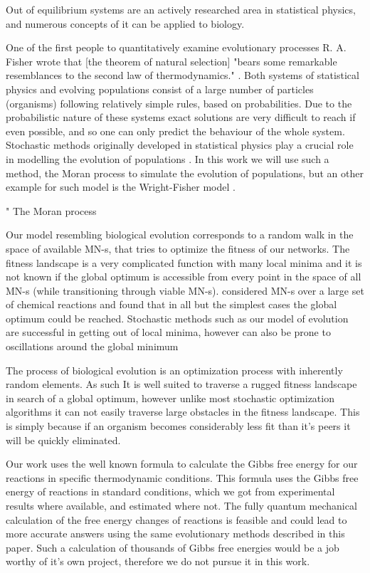 \documentclass[a4paper,12pt]{article}
\begin{document}
	Out of equilibrium systems are an actively researched area in statistical physics, and numerous concepts of it can be applied to biology. 
	
	One of the first people to quantitatively examine evolutionary processes R. A. Fisher wrote that [the theorem of natural selection] "bears some remarkable resemblances to the second law of thermodynamics." \cite{fisherevolution}. Both systems of statistical physics and evolving populations consist of a large number of particles (organisms) following relatively simple rules, based on probabilities. Due to the probabilistic nature of these systems exact solutions are very difficult to reach if even possible, and so one can only predict the behaviour of the whole system. Stochastic methods originally developed in statistical physics play a crucial role in modelling the evolution of populations \cite{stochasticblythe}. In this work we will use such a method, the Moran process \cite{moranprocess} to simulate the evolution of populations, but an other example for such model is the Wright-Fisher model \cite{mathematicalpopgen}.

"
	The Moran process 

	Our model resembling biological evolution corresponds to a random walk in the space of available MN-s, that tries to optimize the fitness of our networks. The fitness landscape is a very complicated function with many local minima and it is not known if the global optimum is accessible from every point in the space of all MN-s (while transitioning through viable MN-s). \cite{historical} considered MN-s over a large set of chemical reactions and found that in all but the simplest cases the global optimum could be reached. Stochastic methods such as our model of evolution are successful in getting out of local minima, however can also be prone to oscillations around the global minimum 

	The process of biological evolution is an optimization process with inherently random elements. As such It is well suited to traverse a rugged fitness landscape in search of a global optimum, however unlike most stochastic optimization algorithms it can not easily traverse large obstacles in the fitness landscape. This is simply because if an organism becomes considerably less fit than it's peers it will be quickly eliminated. 

	Our work uses the well known formula to calculate the Gibbs free energy for our reactions in specific thermodynamic conditions. This formula uses the Gibbs free energy of reactions in standard conditions, which we got from experimental results where available, and estimated \cite{BartekLower} where not. The fully quantum mechanical calculation of the free energy changes of reactions is feasible and could lead to more accurate answers using the same evolutionary methods described in this paper. Such a calculation of thousands of Gibbs free energies would be a job worthy of it's own project, therefore we do not pursue it in this work. 
\end{document}
